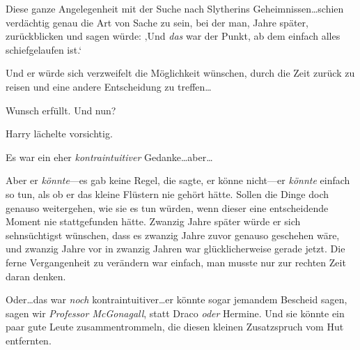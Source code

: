 Diese ganze Angelegenheit mit der Suche nach Slytherins Geheimnissen…schien verdächtig genau die Art von Sache zu sein, bei der man, Jahre später, zurückblicken und sagen würde: ‚Und \emph{das} war der Punkt, ab dem einfach alles schiefgelaufen ist.‘

Und er würde sich verzweifelt die Möglichkeit wünschen, durch die Zeit zurück zu reisen und eine andere Entscheidung zu treffen…

Wunsch erfüllt. Und nun?

Harry lächelte vorsichtig.

Es war ein eher \emph{kontraintuitiver} Gedanke…aber…

Aber er \emph{könnte}—es gab keine Regel, die sagte, er könne nicht—er \emph{könnte} einfach so tun, als ob er das kleine Flüstern nie gehört hätte. Sollen die Dinge doch genauso weitergehen, wie sie es tun würden, wenn dieser eine entscheidende Moment nie stattgefunden hätte. Zwanzig Jahre später würde er sich sehnsüchtigst wünschen, dass es zwanzig Jahre zuvor genauso geschehen wäre, und zwanzig Jahre vor in zwanzig Jahren war glücklicherweise gerade jetzt. Die ferne Vergangenheit zu verändern war einfach, man musste nur zur rechten Zeit daran denken.

Oder…das war \emph{noch} kontraintuitiver…er könnte sogar jemandem Bescheid sagen, sagen wir \emph{Professor McGonagall}, statt Draco \emph{oder} Hermine. Und sie könnte ein paar gute Leute zusammentrommeln, die diesen kleinen Zusatzspruch vom Hut entfernten.

